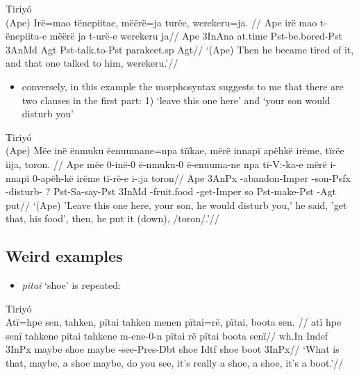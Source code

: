 \documentclass[10pt]{article}
\begin{document}
\ex Tiriyó \\
\label{dados-09-kereramake-p-047-374}    \begingl
    \glpreamble (Ape) Irë=mao        tënepiitae,        mëërë=ja   turëe,            werekeru=ja. //
    \gla Ape irë mao t-ënepiita-e mëërë ja t-urë-e werekeru ja//
    \glb Ape 3InAna at.time Pst-be.bored-Pst 3AnMd Agt Pst-talk.to-Pst parakeet.sp Agt//
        \glft ‘(Ape) Then he became tired of it, and that one talked to him, werekeru.’//  
    \endgl 
\xe

\begin{itemize}
\tightlist
\item
  conversely, in this example the morphosyntax suggests to me that there
  are two clauses in the first part: 1) `leave this one here' and `your
  son would disturb you'
\end{itemize}

\ex Tiriyó \\
\label{dados-09-kereramake-p-049-387}    \begingl
    \glpreamble (Ape) Mëe   inë                 ënmuku           ëenuumane=npa         tïïkae,           mërë  innapï          apëhkë           irëme, tïrëe          iija,    toron. //
    \gla Ape mëe 0-inë-0 ë-nmuku-0 ë-enuuma-ne npa tï-V:-ka-e mërë i-nnapï 0-apëh-kë irëme tï-rë-e i-:ja toron//
    \glb Ape 3AnPx -abandon-Imper -son-Psfx -disturb- ? Pst-Sa-say-Pst 3InMd -fruit.food -get-Imper so Pst-make-Pst -Agt put//
        \glft ‘(Ape) 'Leave this one here, your son, he would disturb you,' he said, 'get that, his food', then, he put it (down), /toron/.’//  
    \endgl 
\xe

\subsection{Weird examples}

\begin{itemize}
\tightlist
\item
  \emph{pïtai} `shoe' is repeated:
\end{itemize}

\ex Tiriyó \\
\label{dados-07-frog-story-marciano-p-089-015}    \begingl
    \glpreamble Atï=hpe     sen,  tahken, pïtai tahken  menen               pïtai=rë,  pïtai, boota sen. //
    \gla atï hpe senï tahkene pïtai tahkene m-ene-0-n pïtai rë pïtai boota senï//
    \glb wh.In Indef 3InPx maybe shoe maybe -see-Pres-Dbt shoe Idtf shoe boot 3InPx//
        \glft ‘What is that, maybe, a shoe maybe, do you see, it's really a shoe, a shoe, it's a boot.’//  
    \endgl 
\xe
\end{document}
